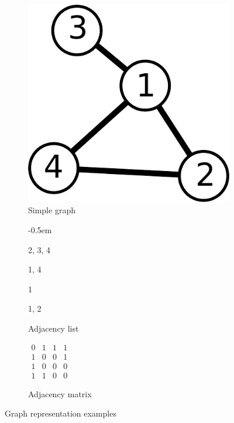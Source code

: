 \begin{figure}[h]
	\begin{subfigure}[b]{0.25\textwidth}
		\centering
		\includegraphics[width=\textwidth]{pix/simple_graph.pdf}
		\caption{Simple graph}
	\end{subfigure}
	\hfill
	\begin{subfigure}[b]{0.25\textwidth}
		\raggedright
		\qquad \begin{description} \itemsep -0.5em
			\item[1:] 2, 3, 4
			\item[2:] 1, 4
			\item[3:] 1
			\item[4:] 1, 2
		\end{description}
		\caption{Adjacency list}
	\end{subfigure}
	\hfill
	\begin{subfigure}[b]{0.25\textwidth}
		\centering
		$\begin{matrix}
			0&1&1&1\\ 1&0&0&1 \\ 1&0&0&0 \\ 1&1&0&0
		\end{matrix}$
		\caption{Adjacency matrix}
	\end{subfigure}
\caption{Graph representation examples}\label{fig:graphexamples}
\end{figure}